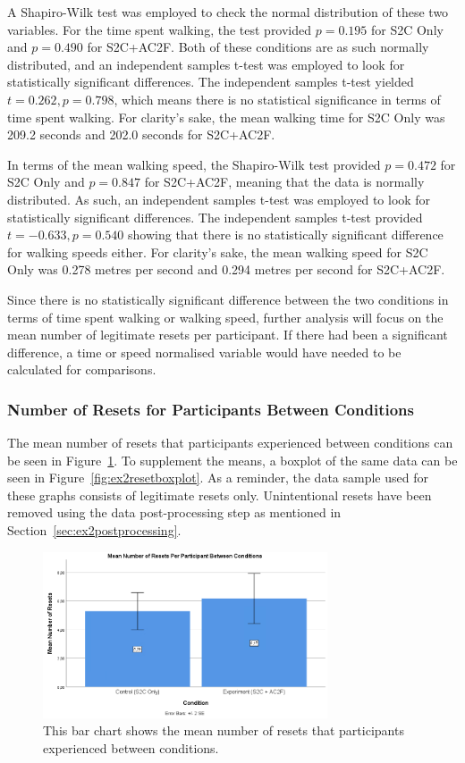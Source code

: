 A Shapiro-Wilk test was employed to check the normal distribution of these two variables. For the time spent walking, the test provided $p = 0.195$ for S2C Only and $p = 0.490$ for S2C+AC2F. Both of these conditions are as such normally distributed, and an independent samples t-test was employed to look for statistically significant differences. The independent samples t-test yielded $t = 0.262, p = 0.798$, which means there is no statistical significance in terms of time spent walking. For clarity's sake, the mean walking time for S2C Only was 209.2 seconds and 202.0 seconds for S2C+AC2F. 

In terms of the mean walking speed, the Shapiro-Wilk test provided $p = 0.472$ for S2C Only and $p = 0.847$ for S2C+AC2F, meaning that the data is normally distributed. As such, an independent samples t-test was employed to look for statistically significant differences. The independent samples t-test provided $t = -0.633, p = 0.540$ showing that there is no statistically significant difference for walking speeds either. For clarity's sake, the mean walking speed for S2C Only was 0.278 metres per second and 0.294 metres per second for S2C+AC2F.

Since there is no statistically significant difference between the two conditions in terms of time spent walking or walking speed, further analysis will focus on the mean number of legitimate resets per participant. If there had been a significant difference, a time or speed normalised variable would have needed to be calculated for comparisons. 

\subsubsection{Number of Resets for Participants Between Conditions}
The mean number of resets that participants experienced between conditions can be seen in Figure~\ref{fig:ex2resetMeans}. To supplement the means, a boxplot of the same data can be seen in Figure~\ref{fig:ex2resetboxplot}. As a reminder, the data sample used for these graphs consists of legitimate resets only. Unintentional resets have been removed using the data post-processing step as mentioned in Section~\ref{sec:ex2postprocessing}.

\begin{figure}[tbph]
    \centering
    \includegraphics[width=0.75\textwidth]{figures/graphs/ResetMeans.png}
    \caption[Mean Number of Resets Between Conditions for Experiment 2]{This bar chart shows the mean number of resets that participants experienced between conditions.}
    \label{fig:ex2resetMeans}
\end{figure}

